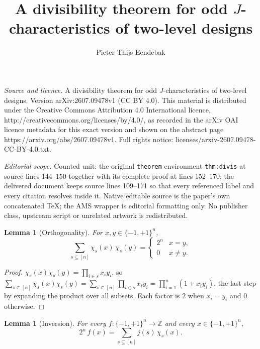 \documentclass[10pt,a4paper]{amsart}
\newtheorem{lemma}[theorem]{Lemma}
\newcommand{\Fpm}{\{-1,+1\}}
\newcommand{\jc}{j}
\begin{document}
\title[A divisibility theorem for odd J-characteristics of two-leve]{A divisibility theorem for odd $J$-characteristics of two-level designs}
\author{Pieter Thijs Eendebak}
\date{}
\maketitle
\noindent\emph{Source and licence.} A divisibility theorem for odd $J$-characteristics of two-level designs. Version arXiv:2607.09478v1 (CC BY 4.0). This material is distributed under the Creative Commons Attribution 4.0 International licence, http://creativecommons.org/licenses/by/4.0/, as recorded in the arXiv OAI licence metadata for this exact version and shown on the abstract page https://arxiv.org/abs/2607.09478v1. Full rights notice: licenses/arxiv-2607.09478-CC-BY-4.0.txt.\par\smallskip
\noindent\textit{Editorial scope.} Counted unit: the original \texttt{theorem} environment \texttt{thm:divis} at source lines 144--150 together with its complete proof at lines 152--170; the delivered document keeps source lines 109--171 so that every referenced label and every citation resolves inside it. Native editable source is the paper's own concatenated TeX; the AMS wrapper is editorial formatting only. No publisher class, upstream script or unrelated artwork is redistributed.
\begin{lemma}[Orthogonality]\label{lem:orth}
For $x,y\in\Fpm^n$,
\begin{equation}\label{eq:orth}
  \sum_{s\subseteq[n]} \chi_s(x)\,\chi_s(y)
  =\begin{cases} 2^n & x=y,\\ 0 & x\ne y.\end{cases}
\end{equation}
\end{lemma}

\begin{proof}
$\chi_s(x)\chi_s(y)=\prod_{i\in s} x_i y_i$, so
$\sum_{s\subseteq[n]}\chi_s(x)\chi_s(y)=\sum_{s\subseteq[n]}\prod_{i\in s}x_iy_i=\prod_{i=1}^n(1+x_iy_i)$,
the last step by expanding the product over all subsets. Each factor is $2$ when
$x_i=y_i$ and $0$ otherwise.
\end{proof}

\begin{lemma}[Inversion]\label{lem:inv}
For every $f:\Fpm^n\to\mathbb Z$ and every $x\in\Fpm^n$,
\begin{equation}\label{eq:inv}
  2^n\, f(x)=\sum_{s\subseteq[n]} \jc(s)\,\chi_s(x).
\end{equation}
\end{lemma}
\end{document}
